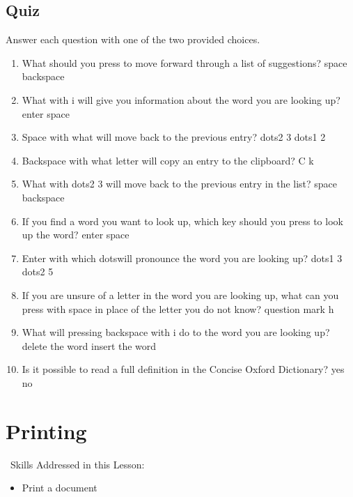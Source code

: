 \documentclass[10pt,letterpaper,twoside]{report}
\begin{document}
{{{\subsection{Quiz}
Answer each question with one of the two provided choices.
\begin{enumerate}
	\item What should you press to move forward through a list of suggestions?
	      space  backspace
	\item What with i will give you information about the word you are looking up?
	      enter    space
	\item Space with what will move back to the previous entry?
	      dots2 3   dots1 2
	\item Backspace with what letter will copy an entry to the clipboard?
	      C  k
	\item What with dots2 3 will move back to the previous entry in the list?
	      space   backspace
	\item If you find a word you want to look up, which key should you press to look up the word?
	      enter      space
	\item Enter with which dotswill pronounce the word you are looking up?
	      dots1 3   dots2 5
	\item If you are unsure of a letter in the word you are looking up, what can you press with space in place of the letter you do not know?
	      question mark    h
	\item What will pressing backspace with i do to the word you are looking up?
	      delete the word    insert the word
	\item Is it possible to read a full definition in the Concise Oxford Dictionary?
	yes  no
\end{enumerate}

\clearpage
\section{ Printing}
\
Skills Addressed in this Lesson:
\begin{itemize}
	\item Print a document
\end{itemize}
}}}
\end{document}
